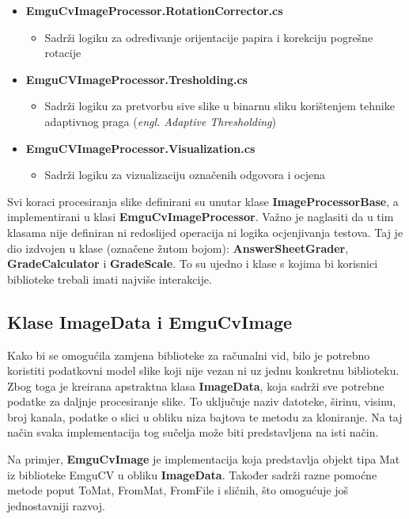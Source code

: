 \documentclass{foi}
\begin{document}
\begin{itemize}
    \item \textbf{EmguCvImageProcessor.RotationCorrector.cs}
    \begin{itemize}
        \item Sadrži logiku za određivanje orijentacije papira i korekciju pogrešne rotacije
    \end{itemize}

    \item \textbf{EmguCVImageProcessor.Tresholding.cs}
    \begin{itemize}
        \item Sadrži logiku za pretvorbu sive slike u binarnu sliku korištenjem tehnike adaptivnog praga (\textit{engl. Adaptive Thresholding})
    \end{itemize}

    \item \textbf{EmguCVImageProcessor.Visualization.cs}
    \begin{itemize}
        \item Sadrži logiku za vizualizaciju označenih odgovora i ocjena
    \end{itemize}
\end{itemize}


Svi koraci procesiranja slike definirani su unutar klase \textbf{ImageProcessorBase}, a implementirani u klasi \textbf{EmguCvImageProcessor}. Važno je naglasiti da u tim klasama nije definiran ni redoslijed operacija ni logika ocjenjivanja testova. Taj je dio izdvojen u klase (označene žutom bojom): \textbf{AnswerSheetGrader}, \textbf{GradeCalculator} i \textbf{GradeScale}. To su ujedno i klase s kojima bi korisnici biblioteke trebali imati najviše interakcije.

\subsection{Klase ImageData i EmguCvImage}

Kako bi se omogućila zamjena biblioteke za računalni vid, bilo je potrebno koristiti podatkovni model slike koji nije vezan ni uz jednu konkretnu biblioteku. Zbog toga je kreirana apstraktna klasa \textbf{ImageData}, koja sadrži sve potrebne podatke za daljnje procesiranje slike. To uključuje naziv datoteke, širinu, visinu, broj kanala, podatke o slici u obliku niza bajtova te metodu za kloniranje. Na taj način svaka implementacija tog sučelja može biti predstavljena na isti način.

Na primjer, \textbf{EmguCvImage} je implementacija koja predstavlja objekt tipa Mat iz biblioteke EmguCV u obliku \textbf{ImageData}. Također sadrži razne pomoćne metode poput ToMat, FromMat, FromFile i sličnih, što omogućuje još jednostavniji razvoj.
\end{document}
